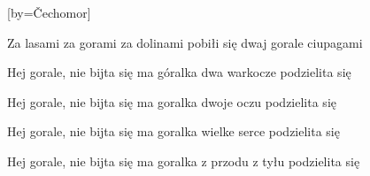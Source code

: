 [by={Čechomor}]

\beginchorus{}
Za lasami za gorami za dolinami
pobiłi się dwaj gorale ciupagami
\endchorus{}

\beginverse{}
\lrep{} Hej gorale, nie bijta się
ma góralka dwa warkocze podzielita się \rrep{}
\endverse{}

\beginchorus{}

\endchorus{}

\beginverse{}
\lrep{} Hej gorale, nie bijta się
ma goralka dwoje oczu podzielita się \rrep{}
\endverse{}

\beginchorus{}

\endchorus{}

\beginverse{}
\lrep{} Hej gorale, nie bijta się
ma goralka wielke serce podzielita się \rrep{}
\endverse{}

\beginchorus{}

\endchorus{}

\beginverse{}
\lrep{} Hej gorale, nie bijta się
ma goralka z przodu z tyłu podzielita się \rrep{}
\endverse{}

\endsong{}
